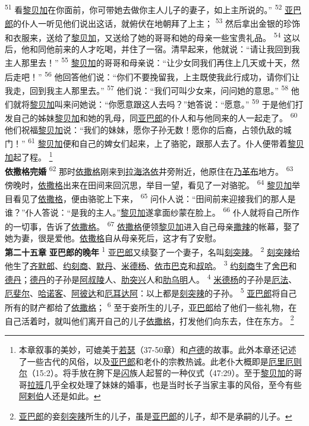 \textsuperscript{51}
看\uline{黎贝加}在你面前，你可带她去做你主人儿子的妻子，如上主所说的。”
\textsuperscript{52}
\uline{亚巴郎}的仆人一听见他们说出这话，就俯伏在地朝拜了上主；
\textsuperscript{53}
然后拿出金银的珍饰和衣服来，送给了\uline{黎贝加}，又送给了她的哥哥和她的母亲一些宝贵礼品。
\textsuperscript{54}
这以后，他和同他前来的人才吃喝，并住了一宿。清早起来，他就说：“请让我回到我主人那里去！”
\textsuperscript{55}
\uline{黎贝加}的哥哥和母亲说：“让少女同我们再住上几天或十天，然后走吧！”
\textsuperscript{56}
他回答他们说：“你们不要挽留我，上主既使我此行成功，请你们让我走，回到我主人那里去。”
\textsuperscript{57}
他们说：“我们可叫少女来，问问她的意思。”
\textsuperscript{58}
他们就将\uline{黎贝加}叫来问她说：“你愿意跟这人去吗？”她答说：“愿意。”
\textsuperscript{59}
于是他们打发自己的姊妹\uline{黎贝加}和她的乳母，同\uline{亚巴郎}的仆人和与他同来的人一起走了。
\textsuperscript{60}
他们祝福\uline{黎贝加}说：“我们的妹妹，愿你子孙无数！愿你的后裔，占领仇敌的城门！”
\textsuperscript{61}
\uline{黎贝加}便和自己的婢女们起来，上了骆驼，跟那人去了。仆人便带着\uline{黎贝加}起了程。
\footnote{本章叙事的美妙，可媲美于\uline{若瑟}（37-50章）和\uline{卢德}的故事。此外本章还记述了一些古代的风俗，以及\uline{亚巴郎}和老仆的宗教热诚。此老仆大概即是\uline{厄里}\uline{厄则尔}（15:2）。将手放在胯下是\uline{闪}族人起誓的一种仪式（47:29）。至于\uline{黎贝加}的哥哥\uline{拉班}几乎全权处理了妹妹的婚事，也是当时长子当家主事的风俗，至今有些\uline{阿剌伯}人还是如此。}
\\
\indent
\textbf{依撒格完婚 }
\textsuperscript{62}
那时\uline{依撒格}刚来到\uline{拉海}\uline{洛依}井旁附近，他原住在\uline{乃革布}地方。
\textsuperscript{63}
傍晚时，\uline{依撒格}出来在田间来回沉思，举目一望，看见了一对骆驼。
\textsuperscript{64}
\uline{黎贝加}举目看见了\uline{依撒格}，便由骆驼上下来，
\textsuperscript{65}
问仆人说：“田间前来迎接我们的那人是谁？”仆人答说：“是我的主人。”\uline{黎贝加}遂拿面纱蒙在脸上。
\textsuperscript{66}
仆人就将自己所作的一切事，告诉了\uline{依撒格}。
\textsuperscript{67}
\uline{依撒格}便领\uline{黎贝加}进入自己母亲\uline{撒辣}的帐幕，娶了她为妻，很是爱他。\uline{依撒格}自从母亲死后，这才有了安慰。
\\
\indent
\textbf{第二十五章 }
\textbf{亚巴郎的晚年 }
\textsuperscript{1}
\uline{亚巴郎}又续娶了一个妻子，名叫\uline{刻突辣}。
\textsuperscript{2}
\uline{刻突辣}给他生了\uline{齐默郎}、\uline{约刻商}、\uline{默丹}、\uline{米德杨}、\uline{依市}\uline{巴克}和\uline{叔哈}。
\textsuperscript{3}
\uline{约刻商}生了\uline{舍巴}和\uline{德丹}；\uline{德丹}的子孙是\uline{阿叔陵}人、\uline{肋突兴}人和\uline{肋乌明}人。
\textsuperscript{4}
\uline{米德杨}的子孙是\uline{厄法}、\uline{厄斐尔}、\uline{哈诺客}、\uline{阿彼达}和\uline{厄耳达阿}：以上都是\uline{刻突辣}的子孙。
\textsuperscript{5}
\uline{亚巴郎}将自己所有的财产都给了\uline{依撒格}；
\textsuperscript{6}
至于妾所生的儿子，\uline{亚巴郎}给了他们一些礼物，在自己活着时，就叫他们离开自己的儿子\uline{依撒格}，打发他们向东去，住在东方。
\footnote{\uline{亚巴郎}的妾\uline{刻突辣}所生的儿子，虽是\uline{亚巴郎}的儿子，却不是承嗣的儿子。}

